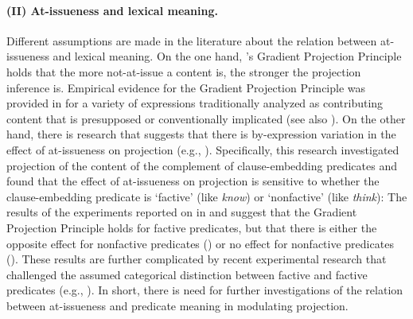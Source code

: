 \documentclass[11pt,fleqn]{article}
\newcommand{\6}{\mbox{$[\hspace*{-.6mm}[$}}
\newcommand{\9}{\mbox{$]\hspace*{-.6mm}]$}}
\newcommand{\citepos}[1]{\citeauthor{#1}'s \citeyear{#1}}
\begin{document}
\paragraph{(II) At-issueness and lexical meaning.} Different assumptions are made in the literature about the relation between at-issueness and lexical meaning. On the one hand, \citepos{tbd-variability} Gradient Projection Principle holds that the more not-at-issue a content is, the stronger the projection inference is. Empirical evidence for the Gradient Projection Principle was provided in \citealt{tbd-variability} for a variety of expressions traditionally analyzed as contributing content that is presupposed or conventionally implicated (see also \citealt{tonhauser-salt26}). On the other hand, there is research that suggests that there is by-expression variation in the effect of at-issueness on projection (e.g., \citealt*{djaerv-bacovcin-salt27, djaerv-bacovcin2020, mahler-etal2020}). Specifically, this research investigated projection of the content of the complement of clause-embedding predicates and found that the effect of at-issueness on projection is sensitive to whether the clause-embedding predicate is  `factive'  (like {\em know}) or `nonfactive' (like {\em think}): The results of the experiments reported on in \citealt{djaerv-bacovcin-salt27,djaerv-bacovcin2020} and \citealt{mahler-etal2020} suggest that the Gradient Projection Principle holds for factive predicates, but that there is either the opposite effect for nonfactive predicates (\citealt{djaerv-bacovcin-salt27,djaerv-bacovcin2020}) or no effect for nonfactive predicates (\citealt{mahler-etal2020}). These results are further complicated by recent experimental research that challenged the assumed categorical distinction between factive and factive predicates (e.g., \citealt{demarneffe-etal-sub23,degen-tonhauser-language}). In short, there is need for further investigations of the relation between at-issueness and predicate meaning in modulating projection.
\end{document}

